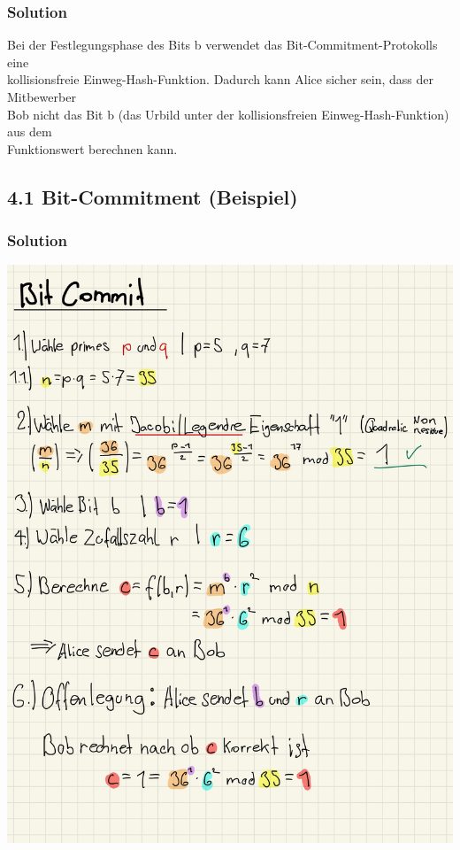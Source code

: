\documentclass[11pt]{article}
\begin{document}
\hypertarget{solution}{%
\subsubsection{Solution}\label{solution}}

Bei der Festlegungsphase des Bits b verwendet das
Bit-Commitment-Protokolls eine\\
kollisionsfreie Einweg-Hash-Funktion. Dadurch kann Alice sicher sein,
dass der Mitbewerber\\
Bob nicht das Bit b (das Urbild unter der kollisionsfreien
Einweg-Hash-Funktion) aus dem\\
Funktionswert berechnen kann.

    \hypertarget{bit-commitment-beispiel}{%
\subsection{4.1 Bit-Commitment
(Beispiel)}\label{bit-commitment-beispiel}}

\hypertarget{solution}{%
\subsubsection{Solution}\label{solution}}

\begin{center}
	\includegraphics{img/bitcom.jpg}
\end{center}
    
\end{document}
